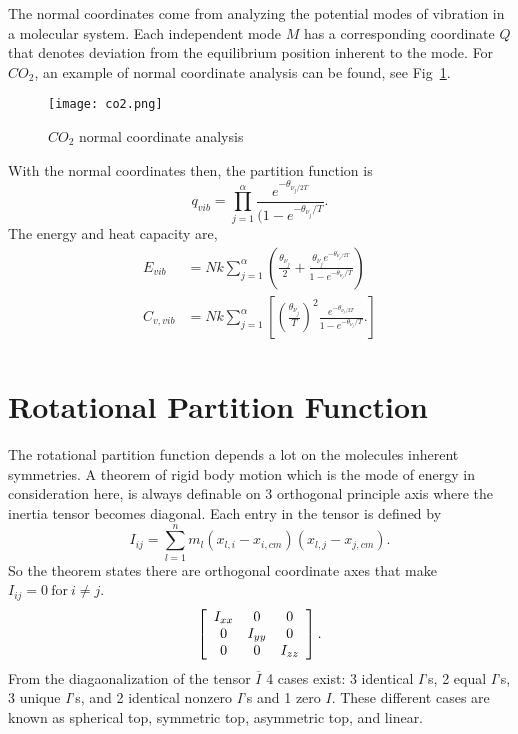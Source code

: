 The normal coordinates come from analyzing the potential modes of vibration in a
molecular system. Each independent mode $M$ has a corresponding coordinate $Q$
that denotes deviation from the equilibrium position inherent to the mode. For
$CO_2$, an example of normal coordinate analysis can be found, see
Fig~\ref{fig:polyco2}.
\begin{figure}[htpb]
	\centering
	\texttt{[image: co2.png]}
	\caption{$CO_2$ normal coordinate analysis}%
	\label{fig:polyco2}
\end{figure}
With the normal coordinates then, the partition function is
\begin{equation*}
	q_{vib} = \prod_{j=1}^{\alpha}{\frac{e^{-\theta_{\nu_{j}/2T}}}{(1 -
	e^{-\theta_{\nu_{j}}/T}}}.
\end{equation*}
The energy and heat capacity are,
\begin{align*}
	E_{vib} &= Nk \sum_{j=1}^{\alpha}{\left(\frac{\theta_{\nu_j}}{2} +
			\frac{\theta_{\nu_j} e^{-\theta_{\nu_{j}/2T}}}{1 -
	e^{-\theta_{\nu_{j}}/T}}\right)}\\
		C_{v,vib} &= Nk
		\sum_{j=1}^{\alpha}{\left[\left( \frac{\theta_{\nu_{j}}}{T}\right)^2
			\frac{e^{-\theta_{\nu_{j}/2T}}}{1 - e^{-\theta_{\nu_{j}}/T}}.
	\right]}\\
\end{align*}

\section{Rotational Partition Function}%
\label{sec:polyrpf}
The rotational partition function depends a lot on the molecules inherent
symmetries. A theorem of rigid body motion which is the mode of energy in
consideration here, is always definable on 3 orthogonal principle axis where the
inertia tensor becomes diagonal. Each entry in the tensor is defined by
\begin{equation*}
	I_{ij} = \sum_{l=1}^{n}{m_l (x_{l,i} - x_{i,cm})(x_{l,j} - x_{j,cm})}.
\end{equation*}
So the theorem states there are orthogonal coordinate axes that make $I_{ij} =
0~\text{for}~i \ne j$.
\begin{equation*}
	\left[\begin{array}{c c c}
		I_{xx} & 0 & 0\\
		0 & I_{yy} & 0\\
		0 & 0 & I_{zz}
	\end{array}\right].
\end{equation*}
From the diagaonalization of the tensor $\overline{I}$ 4 cases exist: 3
identical $I$'s, 2 equal $I$'s, 3 unique $I$'s, and 2 identical nonzero $I$'s
and 1 zero $I$. These different cases are known as
spherical top, symmetric top, asymmetric top, and linear.

